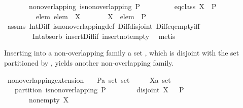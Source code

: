 \begin{isabellebody}
\ \ \ \ \ \ \ non{\isacharunderscore}overlapping{\isacharcolon}\ {\isachardoublequoteopen}is{\isacharunderscore}non{\isacharunderscore}overlapping\ P{\isachardoublequoteclose}\isanewline
\ \ \ \ \ \ \ \ \ eq{\isacharunderscore}class{\isacharcolon}\ {\isachardoublequoteopen}X\ {\isasymin}\ P{\isachardoublequoteclose}\isanewline
\ \ \ \ \ \ \ \ \ elem{\isacharcolon}\ {\isachardoublequoteopen}elem\ {\isasymin}\ X{\isachardoublequoteclose}\isanewline
\ \ \ \ \ \ \ {\isachardoublequoteopen}X\ {\isacharminus}\ {\isacharbraceleft}elem{\isacharbraceright}\ {\isasymnotin}\ P{\isachardoublequoteclose}\isanewline
%
\isadelimproof
\ \ %
\endisadelimproof
%
\isatagproof
{}\isamarkupfalse%
\ assms\ Int{\isacharunderscore}Diff\ is{\isacharunderscore}non{\isacharunderscore}overlapping{\isacharunderscore}def\ Diff{\isacharunderscore}disjoint\ Diff{\isacharunderscore}eq{\isacharunderscore}empty{\isacharunderscore}iff\ \isanewline
\ \ \ \ \ \ \ \ Int{\isacharunderscore}absorb{}\ insert{\isacharunderscore}Diff{\isacharunderscore}if\ insert{\isacharunderscore}not{\isacharunderscore}empty\ \isamarkupfalse%
\ {\isacharparenleft}metis{\isacharparenright}%
\endisatagproof
{\isafoldproof}%
%
\isadelimproof
%
\endisadelimproof
%
\begin{isamarkuptext}%
Inserting into a non-overlapping family  a set , which is disjoint with the set 
  partitioned by , yields another non-overlapping family.%
\end{isamarkuptext}%
\isamarkuptrue%
\isamarkupfalse%
\ non{\isacharunderscore}overlapping{\isacharunderscore}extension{}{\isacharcolon}\isanewline
\ \ \ P{\isacharcolon}{\isacharcolon}{\isachardoublequoteopen}{\isacharprime}a\ set\ set{\isachardoublequoteclose}\isanewline
\ \ \ \ \ X{\isacharcolon}{\isacharcolon}{\isachardoublequoteopen}{\isacharprime}a\ set{\isachardoublequoteclose}\isanewline
\ \ \ partition{\isacharcolon}\ {\isachardoublequoteopen}is{\isacharunderscore}non{\isacharunderscore}overlapping\ P{\isachardoublequoteclose}\isanewline
\ \ \ \ \ \ \ \ disjoint{\isacharcolon}\ {\isachardoublequoteopen}X\ {\isasyminter}\ {\isasymUnion}\ P\ {\isacharequal}\ {\isacharbraceleft}{\isacharbraceright}{\isachardoublequoteclose}\ \isanewline
\ \ \ \ \ \ \ non{\isacharunderscore}empty{\isacharcolon}\ {\isachardoublequoteopen}X\ {\isasymnoteq}\ {\isacharbraceleft}{\isacharbraceright}{\isachardoublequoteclose}\isanewline

\end{isabellebody}

